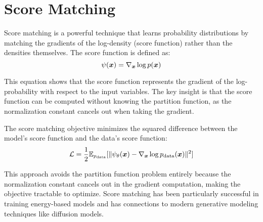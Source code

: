 
\section{Score Matching }
\label{sec:score-matching}

Score matching is a powerful technique that learns probability distributions by matching the gradients of the log-density (score function) rather than the densities themselves. The score function is defined as:
\begin{equation}
\psi(\boldsymbol{x}) = \nabla_{\boldsymbol{x}} \log p(\boldsymbol{x})
\end{equation}

This equation shows that the score function represents the gradient of the log-probability with respect to the input variables. The key insight is that the score function can be computed without knowing the partition function, as the normalization constant cancels out when taking the gradient.

The score matching objective minimizes the squared difference between the model's score function and the data's score function:
\begin{equation}
\mathcal{L} = \frac{1}{2} \mathbb{E}_{p_{\text{data}}}[\|\psi_{\theta}(\boldsymbol{x}) - \nabla_{\boldsymbol{x}} \log p_{\text{data}}(\boldsymbol{x})\|^2]
\end{equation}

This approach avoids the partition function problem entirely because the normalization constant cancels out in the gradient computation, making the objective tractable to optimize. Score matching has been particularly successful in training energy-based models and has connections to modern generative modeling techniques like diffusion models.




